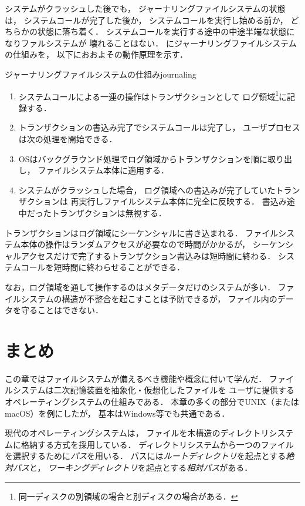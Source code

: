 システムがクラッシュした後でも，
ジャーナリングファイルシステムの状態は，
システムコールが完了した後か，
システムコールを実行し始める前か，
どちらかの状態に落ち着く．
システムコールを実行する途中の中途半端な状態になりファルシステムが
壊れることはない．
にジャーナリングファイルシステムの仕組みを，
以下におおよその動作原理を示す．

{ジャーナリングファイルシステムの仕組み}{journaling}

\begin{enumerate}
\item システムコールによる一連の操作はトランザクションとして
ログ領域\footnote{同一ディスクの別領域の場合と別ディスクの場合がある．
}に記録する．
\item トランザクションの書込み完了でシステムコールは完了し，
ユーザプロセスは次の処理を開始できる．
\item OSはバックグラウンド処理でログ領域からトランザクションを順に取り出し，
ファイルシステム本体に適用する．
\item システムがクラッシュした場合，
ログ領域への書込みが完了していたトランザクションは
再実行しファイルシステム本体に完全に反映する．
書込み途中だったトランザクションは無視する．
\end{enumerate}

トランザクションはログ領域にシーケンシャルに書き込まれる．
ファイルシステム本体の操作はランダムアクセスが必要なので時間がかかるが，
シーケンシャルアクセスだけで完了するトランザクション書込みは短時間に終わる．
システムコールを短時間に終わらせることができる．

なお，ログ領域を通して操作するのはメタデータだけのシステムが多い．
ファイルシステムの構造が不整合を起こすことは予防できるが，
ファイル内のデータを守ることはできない．

\section{まとめ}
この章ではファイルシステムが備えるべき機能や概念に付いて学んだ．
ファイルシステムは二次記憶装置を抽象化・仮想化したファイルを
ユーザに提供するオペレーティングシステムの仕組みである．
本章の多くの部分でUNIX（またはmacOS）を例にしたが，
基本はWindows等でも共通である．

現代のオペレーティングシステムは，
ファイルを木構造のディレクトリシステムに格納する方式を採用している．
ディレクトリシステムから一つのファイルを選択するために\emph{パス}を用いる．
パスには\emph{ルートディレクトリ}を起点とする\emph{絶対パス}と，
\emph{ワーキングディレクトリ}を起点とする\emph{相対パス}がある．

